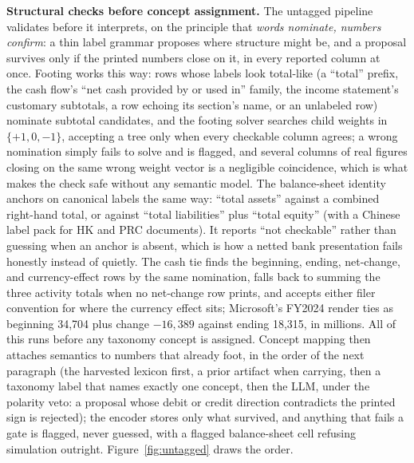 \documentclass[11pt]{article}
\newcommand{\lead}[2]{\par\addvspace{5pt}\textbf{\textcolor{#1}{#2}}}
\begin{document}
\lead{navytwo}{Structural checks before concept assignment.} The untagged pipeline validates before it interprets, on the principle that \emph{words nominate, numbers confirm}: a thin label grammar proposes where structure might be, and a proposal survives only if the printed numbers close on it, in every reported column at once. Footing works this way: rows whose labels look total-like (a ``total'' prefix, the cash flow's ``net cash provided by or used in'' family, the income statement's customary subtotals, a row echoing its section's name, or an unlabeled row) nominate subtotal candidates, and the footing solver searches child weights in $\{+1, 0, -1\}$, accepting a tree only when every checkable column agrees; a wrong nomination simply fails to solve and is flagged, and several columns of real figures closing on the same wrong weight vector is a negligible coincidence, which is what makes the check safe without any semantic model. The balance-sheet identity anchors on canonical labels the same way: ``total assets'' against a combined right-hand total, or against ``total liabilities'' plus ``total equity'' (with a Chinese label pack for HK and PRC documents). It reports ``not checkable'' rather than guessing when an anchor is absent, which is how a netted bank presentation fails honestly instead of quietly. The cash tie finds the beginning, ending, net-change, and currency-effect rows by the same nomination, falls back to summing the three activity totals when no net-change row prints, and accepts either filer convention for where the currency effect sits; Microsoft's FY2024 render ties as beginning 34{,}704 plus change $-16{,}389$ against ending 18{,}315, in millions. All of this runs before any taxonomy concept is assigned. Concept mapping then attaches semantics to numbers that already foot, in the order of the next paragraph (the harvested lexicon first, a prior artifact when carrying, then a taxonomy label that names exactly one concept, then the LLM, under the polarity veto: a proposal whose debit or credit direction contradicts the printed sign is rejected); the encoder stores only what survived, and anything that fails a gate is flagged, never guessed, with a flagged balance-sheet cell refusing simulation outright. Figure~\ref{fig:untagged} draws the order.
\end{document}
